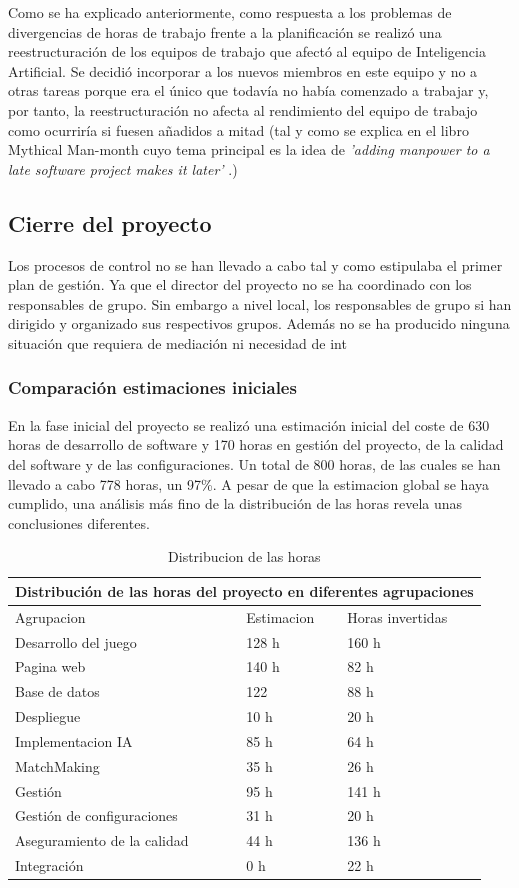Como se ha explicado anteriormente, como respuesta a los problemas de divergencias de horas de trabajo frente a la planificación se realizó una reestructuración de los equipos de trabajo que afectó al equipo de Inteligencia Artificial. Se decidió incorporar a los nuevos miembros en este equipo y no a otras tareas porque era el único que todavía no había comenzado a trabajar y, por tanto, la reestructuración no afecta al rendimiento del equipo de trabajo como ocurriría si fuesen añadidos a mitad (tal y como se explica en el libro Mythical Man-month cuyo tema principal es la idea de \textit{'adding manpower to a late software project makes it later'} \cite{libroMMM}.)


\subsection{Cierre del proyecto}
\label{Cierre del proyecto}
Los procesos de control no se han llevado a cabo tal y como estipulaba el primer plan de gestión. Ya que el director del proyecto no se ha coordinado con los responsables de grupo. Sin embargo a nivel local, los responsables de grupo si han dirigido y organizado sus respectivos grupos. Además no se ha producido ninguna situación que requiera de mediación ni necesidad de int
\subsubsection{Comparación estimaciones iniciales}
En la fase inicial del proyecto se realizó una estimación inicial del coste de 630 horas de desarrollo de software y 170 horas en gestión del proyecto, de la calidad del software y de las configuraciones. Un total de 800 horas, de las cuales se han llevado a cabo 778 horas, un 97\%. A pesar de que la estimacion global se haya cumplido, una análisis más fino de la distribución de las horas revela unas conclusiones diferentes.

\begin{table}[htb]
\centering
\begin{tabular}{|l|l|l|}
\hline
\multicolumn{3}{|c|}{Distribución de las horas del proyecto en diferentes agrupaciones} \\ \hline
	Agrupacion & Estimacion & Horas invertidas \\ \hline
	Desarrollo del juego & 128 h & 160 h \\ \hline
	Pagina web & 140 h & 82 h \\ \hline
	Base de datos & 122 & 88 h \\ \hline
	Despliegue & 10 h & 20 h \\ \hline
	Implementacion IA & 85 h & 64 h \\ \hline
	MatchMaking & 35 h & 26 h \\ \hline
	Gestión & 95 h & 141 h \\ \hline
	Gestión de configuraciones & 31 h & 20 h \\ \hline
	Aseguramiento de la calidad & 44 h & 136 h \\ \hline
	Integración & 0 h & 22 h \\ \hline
 \end{tabular}
 \caption{Distribucion de las horas }
\label{}
\end{table}

